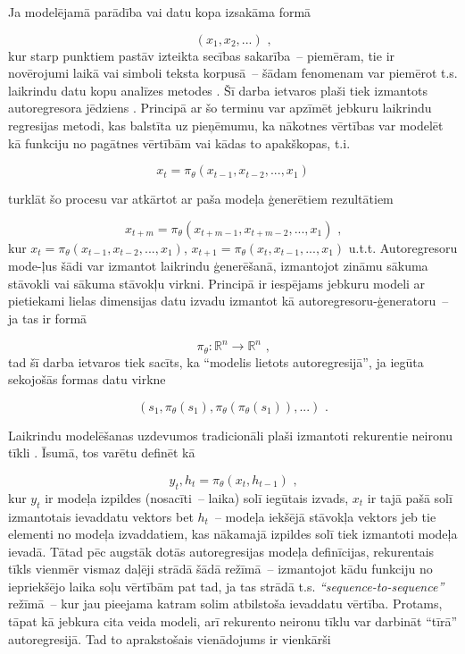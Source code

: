 \documentclass[12pt, a4paper]{article}
\numberwithin{equation}{section} %
\begin{document}
Ja modelējamā parādība vai datu kopa izsakāma formā

\begin{equation} 
    (x_1, x_2, ...)
\text{ ,}
\end{equation}
kur starp punktiem pastāv izteikta secības sakarība~-- piemēram, tie ir novērojumi laikā vai simboli teksta korpusā~-- šādam fenomenam var piemērot t.s. laikrindu datu kopu analīzes metodes \cite{time_series}. Šī darba ietvaros plaši tiek izmantots autoregresora jēdziens \cite{autoregressor}. Principā ar šo terminu var apzīmēt jebkuru laikrindu regresijas metodi, kas balstīta uz pieņēmumu, ka nākotnes vērtības var modelēt kā funkciju no pagātnes vērtībām vai kādas to apakškopas, t.i.

\begin{equation} 
    x_t = \pi_{\theta}(x_{t-1}, x_{t-2}, ..., x_1)
\end{equation}

turklāt šo procesu var atkārtot ar paša modeļa ģenerētiem rezultātiem

\begin{equation} 
    x_{t+m} = \pi_{\theta}(x_{t+m-1}, x_{t+m-2}, ..., x_1)
\text{ ,}
\end{equation}
kur $x_{t} =  \pi_{\theta}(x_{t-1}, x_{t-2}, ..., x_1)$, $x_{t+1} =  \pi_{\theta}(x_{t}, x_{t-1}, ..., x_1)$ u.t.t. Autoregresoru mode-ļus šādi var izmantot laikrindu ģenerēšanā, izmantojot zināmu sākuma stāvokli vai sākuma stāvokļu virkni. Principā ir iespējams jebkuru modeli ar pietiekami lielas dimensijas datu izvadu izmantot kā autoregresoru-ģeneratoru~-- ja tas ir formā 

\begin{equation} 
    \pi_{\theta}: \mathbb{R}^n \rightarrow \mathbb{R}^n
\text{ ,}
\end{equation}
tad šī darba ietvaros tiek sacīts, ka ``modelis lietots autoregresijā'', ja iegūta sekojošās formas datu virkne

\begin{equation} 
    (s_1, \pi_{\theta}(s_1), \pi_{\theta}(\pi_{\theta}(s_1)), ... )
\text{ .}
\end{equation}

Laikrindu modelēšanas uzdevumos tradicionāli plaši izmantoti rekurentie neironu tīkli \cite{rnn}. Īsumā, tos varētu definēt kā 

\begin{equation} 
    y_t, h_t = \pi_{\theta}(x_t, h_{t-1})
\text{ ,}
\end{equation}
kur $y_t$ ir modeļa izpildes (nosacīti~-- laika) solī iegūtais izvads, $x_t$ ir tajā pašā solī izmantotais ievaddatu vektors bet $h_t$~-- modeļa iekšējā stāvokļa vektors jeb tie elementi no modeļa izvaddatiem, kas nākamajā izpildes solī tiek izmantoti modeļa ievadā. Tātad pēc augstāk dotās autoregresijas modeļa definīcijas, rekurentais tīkls vienmēr vismaz daļēji strādā šādā režīmā~-- izmantojot kādu funkciju no iepriekšējo laika soļu vērtībām pat tad, ja tas strādā t.s. \textit{``sequence-to-sequence''} režīmā~-- kur jau pieejama katram solim atbilstoša ievaddatu vērtība. Protams, tāpat kā jebkura cita veida modeli, arī rekurento neironu tīklu var darbināt ``tīrā'' autoregresijā. Tad to aprakstošais vienādojums ir vienkārši
\end{document}
